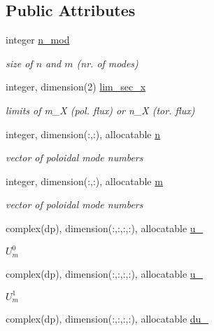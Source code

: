 \subsection*{Public Attributes}
\begin{DoxyCompactItemize}
\item 
integer \hyperlink{structx__vars_1_1x__1__type_a2c6f8950aab84d1c8496d676765e495d}{n\+\_\+mod}
\begin{DoxyCompactList}\small\item\em size of $n$ and $m$ (nr. of modes) \end{DoxyCompactList}\item 
integer, dimension(2) \hyperlink{structx__vars_1_1x__1__type_a13c0f5a062916cf55e6bbaa906d0245b}{lim\+\_\+sec\+\_\+x}
\begin{DoxyCompactList}\small\item\em limits of {\ttfamily m\+\_\+X} (pol. flux) or {\ttfamily n\+\_\+X} (tor. flux) \end{DoxyCompactList}\item 
integer, dimension(\+:,\+:), allocatable \hyperlink{structx__vars_1_1x__1__type_aa8357fc77cfb833b7ead7310fe8cdd2a}{n}
\begin{DoxyCompactList}\small\item\em vector of poloidal mode numbers \end{DoxyCompactList}\item 
integer, dimension(\+:,\+:), allocatable \hyperlink{structx__vars_1_1x__1__type_a02aaa9d5638a17b6ed2ab1c46093606c}{m}
\begin{DoxyCompactList}\small\item\em vector of poloidal mode numbers \end{DoxyCompactList}\item 
complex(dp), dimension(\+:,\+:,\+:,\+:), allocatable \hyperlink{structx__vars_1_1x__1__type_a49ba10abb2c45fc9f6faf0412f7af198}{u\+\_}
\begin{DoxyCompactList}\small\item\em $U_m^0$ \end{DoxyCompactList}\item 
complex(dp), dimension(\+:,\+:,\+:,\+:), allocatable \hyperlink{structx__vars_1_1x__1__type_ab5cb4ea2b358b6787b84ffccdbc65dab}{u\+\_}
\begin{DoxyCompactList}\small\item\em $U_m^1$ \end{DoxyCompactList}\item 
complex(dp), dimension(\+:,\+:,\+:,\+:), allocatable \hyperlink{structx__vars_1_1x__1__type_a1132efa4306e57aa86899b2eb346cec6}{du\+\_}

\end{DoxyCompactItemize}
